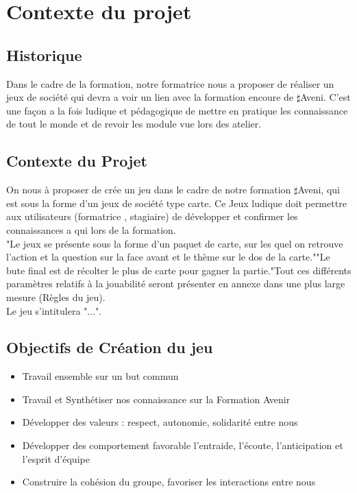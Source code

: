 \chapter{Contexte du projet}

\section{Historique}

Dans le cadre de la formation, notre formatrice \formatise nous a proposer de réaliser un jeux de société qui devra a voir un lien avec la formation encoure de $\sharp$Aveni. C'est une façon a la fois ludique et pédagogique de mettre en pratique les connaissance de tout le monde et de revoir les module vue lors des atelier.


\section{Contexte du Projet}

On nous à proposer de crée un jeu dans le cadre de notre formation $\sharp$Aveni, qui est sous la forme d'un jeux de société type carte. Ce Jeux ludique doit permettre aux utilisateurs (formatrice , stagiaire) de développer et confirmer les connaissances a qui lors de la formation.\\

"Le jeux se présente sous la forme d'un paquet de carte, sur les quel on retrouve l'action et la question sur la face avant et le thème sur le dos de la carte.""Le bute final est de récolter le plus de carte pour gagner la partie."Tout ces différents paramètres relatifs à la jouabilité seront présenter en annexe dans une plus large mesure (Règles du jeu).\\

Le jeu s'intitulera "...".

\section{Objectifs de Création du jeu}

\begin{itemize}
	\item Travail ensemble sur un but commun
	\item Travail et Synthétiser nos connaissance sur la Formation Avenir
	\item Développer des valeurs : respect, autonomie, solidarité entre nous
	\item Développer des comportement favorable l'entraide, l'écoute, l'anticipation et l'esprit d'équipe
	\item Construire la cohésion du groupe, favoriser les interactions entre nous
\end{itemize}

